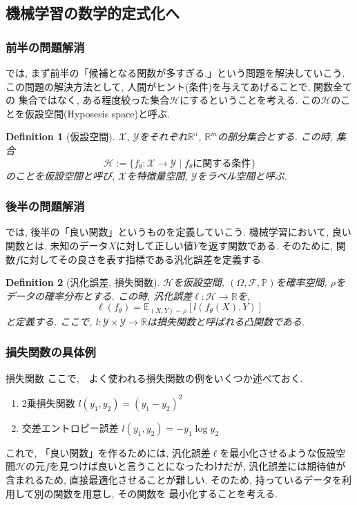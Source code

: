 \documentclass[dvipdfmx,11pt]{beamer}		%
\newtheorem{defi}{Definition}
\newcommand{\R}{\mathbb{R}}
\newcommand{\X}{\mathcal{X}}
\newcommand{\Y}{\mathcal{Y}}
\newcommand{\Hil}{\mathcal{H}}
\begin{document}
    \subsection{機械学習の数学的定式化へ}
    \begin{frame}\frametitle{前半の問題解消}
        では, まず前半の「候補となる関数が多すぎる.」という問題を解決していこう. \\ \indent
        この問題の解決方法として, 人間がヒント(条件)を与えてあげることで, 関数全ての
        集合ではなく, ある程度絞った集合$\Hil$にするということを考える. この$\Hil$のことを仮設空間(Hyposesis space)と呼ぶ.
        \begin{defi}[仮設空間]
            $\X$, $\Y$をそれぞれ$\R^n$, $\R^m$の部分集合とする. この時, 集合
            \begin{equation*}
                \Hil :=\{f_{\theta} :\X\to\Y\mid\text{$f_{\theta}$に関する条件}\}
            \end{equation*}
            のことを仮設空間と呼び, $\X$を特徴量空間, $\Y$をラベル空間と呼ぶ.
        \end{defi}
    \end{frame}
    \begin{frame}\frametitle{後半の問題解消}
        では, 後半の「良い関数」というものを定義していこう. 
        機械学習において, 良い関数とは, 未知のデータ$X$に対して正しい値$Y$を返す関数である. 
        そのために, 関数$f$に対してその良さを表す指標である汎化誤差を定義する.
        \begin{defi}[汎化誤差, 損失関数]
            $\Hil$を仮設空間, $(\Omega, \mathcal{F}, \mathbb{P})$を確率空間, $\rho$をデータの確率分布とする.
            この時, 汎化誤差$\ell:\Hil\to\R$を, 
            \begin{equation*}
                \ell(f_{\theta}) = \mathbb{E}_{(X, Y)\sim\rho}[l(f_{\theta}(X), Y)]
            \end{equation*}
            と定義する. ここで, $l:\Y\times\Y\to\R$は損失関数と呼ばれる凸関数である. 
        \end{defi}
    \end{frame}
    \begin{frame}
        \frametitle{損失関数の具体例}
        \begin{block}{損失関数}
            ここで,　よく使われる損失関数の例をいくつか述べておく. 
            \begin{enumerate}
                \item 2乗損失関数 $l(y_1, y_2) = (y_1 - y_2)^2$
                \item 交差エントロピー誤差 $l(y_1, y_2) = -y_1\log y_2$
            \end{enumerate}
        \end{block}
        これで, 「良い関数」を作るためには, 汎化誤差$\ell$を最小化させるような仮設空間$\Hil$の元$f$を見つけば良いと言うことになったわけだが, 
        汎化誤差には期待値が含まれるため, 直接最適化させることが難しい. そのため, 持っているデータを利用して別の関数を用意し, その関数を
        最小化することを考える. 
    \end{frame}
\end{document}
